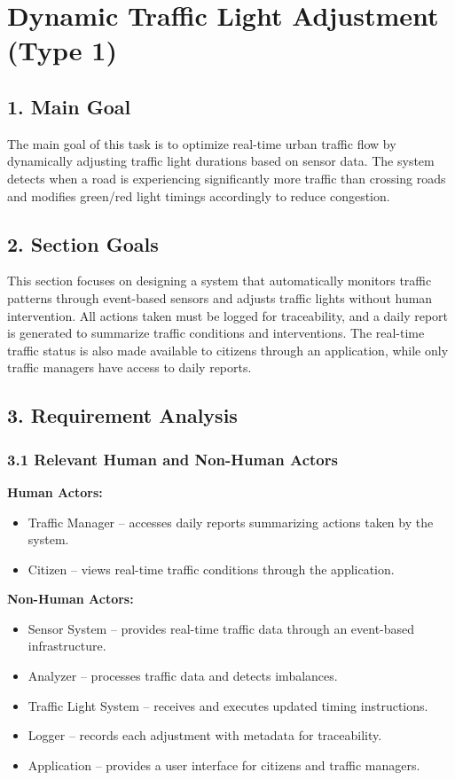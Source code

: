 \section{Dynamic Traffic Light Adjustment (Type 1)}

\subsection*{1. Main Goal}

The main goal of this task is to optimize real-time urban traffic flow by dynamically adjusting traffic light durations based on sensor data. The system detects when a road is experiencing significantly more traffic than crossing roads and modifies green/red light timings accordingly to reduce congestion.

\subsection*{2. Section Goals}

This section focuses on designing a system that automatically monitors traffic patterns through event-based sensors and adjusts traffic lights without human intervention. All actions taken must be logged for traceability, and a daily report is generated to summarize traffic conditions and interventions. The real-time traffic status is also made available to citizens through an application, while only traffic managers have access to daily reports.

\subsection*{3. Requirement Analysis}

\subsubsection*{3.1 Relevant Human and Non-Human Actors}

\textbf{Human Actors:}
\begin{itemize}
    \item Traffic Manager – accesses daily reports summarizing actions taken by the system.
    \item Citizen – views real-time traffic conditions through the application.
\end{itemize}

\textbf{Non-Human Actors:}
\begin{itemize}
    \item Sensor System – provides real-time traffic data through an event-based infrastructure.
    \item Analyzer – processes traffic data and detects imbalances.
    \item Traffic Light System – receives and executes updated timing instructions.
    \item Logger – records each adjustment with metadata for traceability.
    \item Application – provides a user interface for citizens and traffic managers.
\end{itemize}

